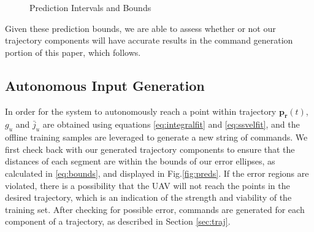 \documentclass[letterpaper, 10 pt, conference]{ieeeconf}  %
\begin{document}
\begin{figure}[ht]
	\centering
	\caption{Prediction Intervals and Bounds}
	\label{fig:bounds}
\end{figure}

Given these prediction bounds, we are able to assess whether or not our trajectory components will have accurate results in the command generation portion of this paper, which follows.

\subsection{Autonomous Input Generation} \label{sec:generate}

In order for the system to autonomously reach a point within trajectory $\mathbf{p_r}(t)$, $g_u$ and $\bar{j}_u$ are obtained using equations \eqref{eq:integralfit} and \eqref{eq:ssvelfit}, and the offline training samples are leveraged to generate a new string of commands. We first check back with our generated trajectory components to ensure that the distances of each segment are within the bounds of our error ellipses, as calculated in \eqref{eq:bounds}, and displayed in Fig.\ref{fig:preds}. If the error regions are violated, there is a possibility that the UAV will not reach the points in the desired trajectory, which is an indication of the strength and viability of the training set. After checking for possible error, commands are generated for each component of a trajectory, as described in Section \ref{sec:traj}.
\end{document}
